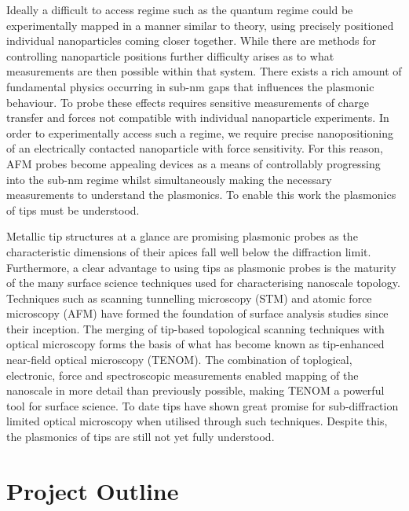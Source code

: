 \documentclass[12pt, a4paper, twoside]{book}
\begin{document}
Ideally a difficult to access regime such as the quantum regime could be experimentally mapped in a manner similar to theory, using precisely positioned individual nanoparticles coming closer together. While there are methods for controlling nanoparticle positions further difficulty arises as to what measurements are then possible within that system. There exists a rich amount of fundamental physics occurring in sub-nm gaps that influences the plasmonic behaviour. To probe these effects requires sensitive measurements of charge transfer and forces not compatible with individual nanoparticle experiments. In order to experimentally access such a regime, we require precise nanopositioning of an electrically contacted nanoparticle with force sensitivity. For this reason, AFM probes become appealing devices as a means of controllably progressing into the sub-nm regime whilst simultaneously making the necessary measurements to understand the plasmonics. To enable this work the plasmonics of tips must be understood.

Metallic tip structures at a glance are promising plasmonic probes as the characteristic dimensions of their apices fall well below the diffraction limit.
Furthermore, a clear advantage to using tips as plasmonic probes is the maturity of the many surface science techniques used for characterising nanoscale topology. Techniques such as scanning tunnelling microscopy (STM) \cite{binnig1982} and atomic force microscopy (AFM) \cite{binnig1986} have formed the foundation of surface analysis studies since their inception. The merging of tip-based topological scanning techniques with optical microscopy forms the basis of what has become known as tip-enhanced near-field optical microscopy (TENOM). The combination of toplogical, electronic, force and spectroscopic measurements enabled mapping of the nanoscale in more detail than previously possible, making TENOM a powerful tool for surface science. To date tips have shown great promise for sub-diffraction limited optical microscopy when utilised through such techniques. Despite this, the plasmonics of tips are still not yet fully understood.

\section{Project Outline}
\end{document}
